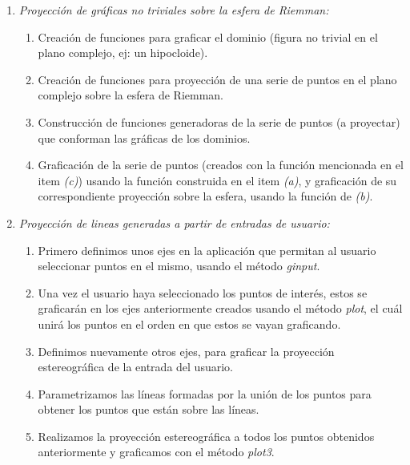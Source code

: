 \documentclass[a4paper,12pt]{article}
\begin{document}
    \begin{enumerate}
        \item \textit{Proyección de gráficas no triviales sobre la esfera de Riemman:} 
        
        \begin{enumerate}

            \item Creación de funciones para graficar el dominio (figura no trivial en el plano complejo, ej: un hipocloide). 
            \item Creación de funciones para proyección de una serie de puntos en el plano complejo sobre la esfera de Riemman.
            
            \item Construcción de funciones generadoras de la serie de puntos (a proyectar) que conforman las gráficas de los dominios.
            
            \item Graficación de la serie de puntos (creados con la función mencionada en el item \textit{(c)})  usando la función construida en el item \textit{(a)}, y graficación de su correspondiente proyección sobre la esfera, usando la función de  \textit{(b)}.
        \end{enumerate}
        
        \item \textit{Proyección de lineas generadas a partir de entradas de usuario:}
        
        \begin{enumerate}
            \item Primero definimos unos ejes en la aplicación que permitan al usuario seleccionar puntos en el mismo, usando el método \emph{ginput}.
            
            \item Una vez el usuario haya seleccionado los puntos de interés, estos se graficarán en los ejes anteriormente creados usando el método \emph{plot}, el cuál unirá los puntos en el orden en que estos se vayan graficando.
            
            \item Definimos nuevamente otros ejes, para graficar la proyección estereográfica de la entrada del usuario.
            
            \item Parametrizamos las líneas formadas por la unión de los puntos para obtener los puntos que están sobre las líneas.
            
            \item Realizamos la proyección estereográfica a todos los puntos obtenidos anteriormente y graficamos con el método \emph{plot3}.
            
        \end{enumerate}
    \end{enumerate}
  
\end{document}
